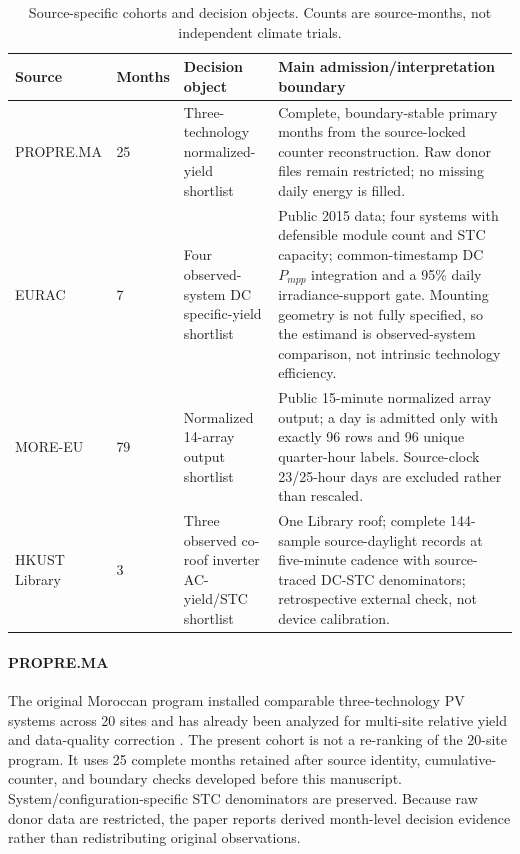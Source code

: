 \documentclass[preprint,12pt]{elsarticle}
\begin{document}
\begin{table}[H]
\centering
\caption{Source-specific cohorts and decision objects. Counts are source-months, not independent climate trials.}
\label{tab:data}
\footnotesize
\begin{tabular}{p{2.7cm}p{1.2cm}p{3.0cm}p{4.7cm}}
\toprule
Source & Months & Decision object & Main admission/interpretation boundary \\
\midrule
PROPRE.MA & 25 & Three-technology normalized-yield shortlist & Complete, boundary-stable primary months from the source-locked counter reconstruction. Raw donor files remain restricted; no missing daily energy is filled. \\
EURAC & 7 & Four observed-system DC specific-yield shortlist & Public 2015 data; four systems with defensible module count and STC capacity; common-timestamp DC $P_{mpp}$ integration and a 95\% daily irradiance-support gate. Mounting geometry is not fully specified, so the estimand is observed-system comparison, not intrinsic technology efficiency. \\
MORE-EU & 79 & Normalized 14-array output shortlist & Public 15-minute normalized array output; a day is admitted only with exactly 96 rows and 96 unique quarter-hour labels. Source-clock 23/25-hour days are excluded rather than rescaled. \\
HKUST Library & 3 & Three observed co-roof inverter AC-yield/STC shortlist & One Library roof; complete 144-sample source-daylight records at five-minute cadence with source-traced DC-STC denominators; retrospective external check, not device calibration. \\
\bottomrule
\end{tabular}
\end{table}

\paragraph{PROPRE.MA} The original Moroccan program installed comparable three-technology PV systems across 20 sites and has already been analyzed for multi-site relative yield and data-quality correction \cite{bennouna2019}. The present cohort is not a re-ranking of the 20-site program. It uses 25 complete months retained after source identity, cumulative-counter, and boundary checks developed before this manuscript. System/configuration-specific STC denominators are preserved. Because raw donor data are restricted, the paper reports derived month-level decision evidence rather than redistributing original observations.
\end{document}
